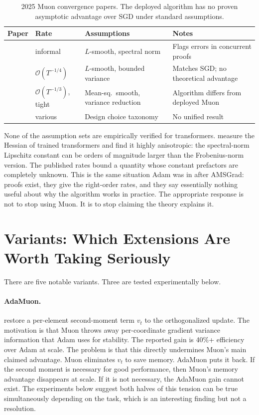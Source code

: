 \documentclass[11pt]{article}
\begin{document}
\begin{table}[h]
\centering\footnotesize
\renewcommand{\arraystretch}{1.15}
\begin{tabular}{p{2.9cm}p{2.5cm}p{3.8cm}p{3.8cm}}
\toprule
Paper & Rate & Assumptions & Notes \\
\midrule
\citet{li2025note} & informal & $L$-smooth, spectral norm & Flags errors in concurrent proofs \\
\citet{shen2025convergence} & $\mathcal{O}(T^{-1/4})$ & $L$-smooth, bounded variance & Matches SGD; no theoretical advantage \\
\citet{chang2025beyond} & $\mathcal{O}(T^{-1/3})$, tight & Mean-sq.\ smooth, variance reduction & Algorithm differs from deployed Muon \\
\citet{crawshaw2025exploration} & various & Design choice taxonomy & No unified result \\
\bottomrule
\end{tabular}
\caption{2025 Muon convergence papers. The deployed algorithm has no proven asymptotic advantage over SGD under standard assumptions.}
\label{tab:conv}
\end{table}

None of the assumption sets are empirically verified for transformers. \citet{dong2025quantifying} measure the Hessian of trained transformers and find it highly anisotropic: the spectral-norm Lipschitz constant can be orders of magnitude larger than the Frobenius-norm version. The published rates bound a quantity whose constant prefactors are completely unknown. This is the same situation Adam was in after AMSGrad: proofs exist, they give the right-order rates, and they say essentially nothing useful about why the algorithm works in practice. The appropriate response is not to stop using Muon. It is to stop claiming the theory explains it.

\section{Variants: Which Extensions Are Worth Taking Seriously}
\label{sec:variants}

There are five notable variants. Three are tested experimentally below.

\paragraph{AdaMuon.}
\citet{si2025adamuon} restore a per-element second-moment term $v_t$ to the orthogonalized update. The motivation is that Muon throws away per-coordinate gradient variance information that Adam uses for stability. The reported gain is 40\%+ efficiency over Adam at scale. The problem is that this directly undermines Muon's main claimed advantage. Muon eliminates $v_t$ to save memory. AdaMuon puts it back. If the second moment is necessary for good performance, then Muon's memory advantage disappears at scale. If it is not necessary, the AdaMuon gain cannot exist. The experiments below suggest both halves of this tension can be true simultaneously depending on the task, which is an interesting finding but not a resolution.
\end{document}
